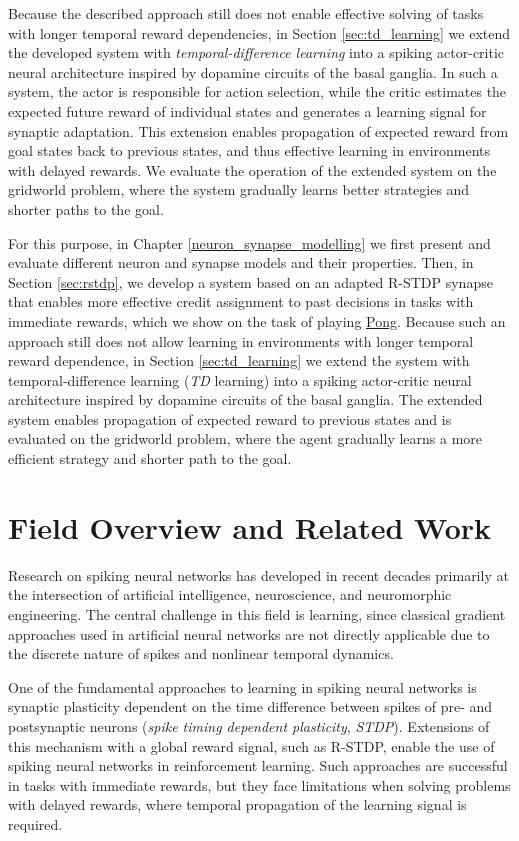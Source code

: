 \documentclass[a4paper,12pt,openright]{book}
\begin{document}
Because the described approach still does not enable effective solving of tasks with longer temporal reward dependencies, in Section \ref{sec:td_learning} we extend the developed system with \textit{temporal-difference learning} into a spiking actor-critic neural architecture inspired by dopamine circuits of the basal ganglia. In such a system, the actor is responsible for action selection, while the critic estimates the expected future reward of individual states and generates a learning signal for synaptic adaptation. This extension enables propagation of expected reward from goal states back to previous states, and thus effective learning in environments with delayed rewards. We evaluate the operation of the extended system on the gridworld problem, where the system gradually learns better strategies and shorter paths to the goal.

For this purpose, in Chapter \ref{neuron_synapse_modelling} we first present and evaluate different neuron and synapse models and their properties. Then, in Section \ref{sec:rstdp}, we develop a system based on an adapted R-STDP synapse that enables more effective credit assignment to past decisions in tasks with immediate rewards, which we show on the task of playing \href{https://en.wikipedia.org/wiki/Pong}{Pong}. Because such an approach still does not allow learning in environments with longer temporal reward dependence, in Section \ref{sec:td_learning} we extend the system with temporal-difference learning (\textit{TD} learning) into a spiking actor-critic neural architecture inspired by dopamine circuits of the basal ganglia. The extended system enables propagation of expected reward to previous states and is evaluated on the gridworld problem, where the agent gradually learns a more efficient strategy and shorter path to the goal.

\chapter{Field Overview and Related Work}
Research on spiking neural networks has developed in recent decades primarily at the intersection of artificial intelligence, neuroscience, and neuromorphic engineering. The central challenge in this field is learning, since classical gradient approaches used in artificial neural networks are not directly applicable due to the discrete nature of spikes and nonlinear temporal dynamics.

One of the fundamental approaches to learning in spiking neural networks is synaptic plasticity dependent on the time difference between spikes of pre- and postsynaptic neurons (\textit{spike timing dependent plasticity}, \textit{STDP}). Extensions of this mechanism with a global reward signal, such as R-STDP, enable the use of spiking neural networks in reinforcement learning. Such approaches are successful in tasks with immediate rewards, but they face limitations when solving problems with delayed rewards, where temporal propagation of the learning signal is required.
\end{document}
